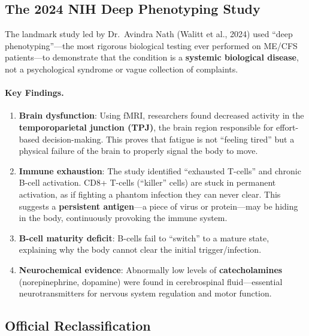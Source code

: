 \subsection{The 2024 NIH Deep Phenotyping Study}
\label{subsec:nih-study}

The landmark study led by Dr.\ Avindra Nath (Walitt et al., 2024) used ``deep phenotyping''---the most rigorous biological testing ever performed on ME/CFS patients---to demonstrate that the condition is a \textbf{systemic biological disease}, not a psychological syndrome or vague collection of complaints.

\paragraph{Key Findings.}

\begin{enumerate}
    \item \textbf{Brain dysfunction}: Using fMRI, researchers found decreased activity in the \textbf{temporoparietal junction (TPJ)}, the brain region responsible for effort-based decision-making. This proves that fatigue is not ``feeling tired'' but a physical failure of the brain to properly signal the body to move.

    \item \textbf{Immune exhaustion}: The study identified ``exhausted T-cells'' and chronic B-cell activation. CD8+ T-cells (``killer'' cells) are stuck in permanent activation, as if fighting a phantom infection they can never clear. This suggests a \textbf{persistent antigen}---a piece of virus or protein---may be hiding in the body, continuously provoking the immune system.

    \item \textbf{B-cell maturity deficit}: B-cells fail to ``switch'' to a mature state, explaining why the body cannot clear the initial trigger/infection.

    \item \textbf{Neurochemical evidence}: Abnormally low levels of \textbf{catecholamines} (norepinephrine, dopamine) were found in cerebrospinal fluid---essential neurotransmitters for nervous system regulation and motor function.
\end{enumerate}

\subsection{Official Reclassification}
\label{subsec:reclassification}

